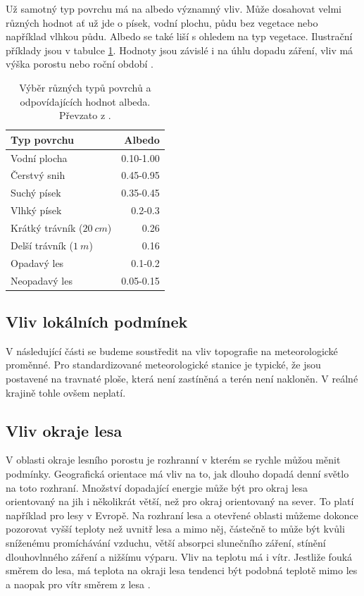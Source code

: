 Už samotný typ povrchu má na albedo významný vliv. Může dosahovat velmi různých hodnot ať už jde o písek, vodní plochu, půdu bez vegetace nebo například vlhkou půdu. Albedo se také liší s ohledem na typ vegetace. Ilustrační příklady jsou v tabulce \ref{tab:albedo}. Hodnoty jsou závislé i na úhlu dopadu záření, vliv má výška porostu nebo roční období \parencite{arya2001,alma}.

\begin{table}
\centering\footnotesize\sf
\begin{tabular}{lr}
\toprule
Typ povrchu & Albedo \\
\midrule
Vodní plocha & 0.10-1.00 \\
Čerstvý snih & 0.45-0.95 \\
Suchý písek & 0.35-0.45\\
Vlhký písek & 0.2-0.3\\
Krátký trávník ($\SI{20}{cm}$) & 0.26\\
Delší trávník ($\SI{1}{m}$) & 0.16\\
Opadavý les & 0.1-0.2\\
Neopadavý les & 0.05-0.15\\
\bottomrule
\end{tabular}
	\caption{Výběr různých typů povrchů a odpovídajících hodnot albeda. Převzato z \parencite{arya2001}.}
\label{tab:albedo}
\end{table}

\subsection{Vliv lokálních podmínek} \label{chap:topo}
V následující části se budeme soustředit na vliv topografie na meteorologické proměnné. Pro standardizované meteorologické stanice je typické, že jsou postavené na travnaté ploše, která není zastíněná a terén není nakloněn. V reálné krajině tohle ovšem neplatí.

\subsection{Vliv okraje lesa}
V oblasti okraje lesního porostu je rozhranní v kterém se rychle můžou měnit podmínky. Geografická orientace má vliv na to, jak dlouho dopadá denní světlo na toto rozhraní. Množství dopadající energie může být pro okraj lesa orientovaný na jih i několikrát větší, než pro okraj orientovaný na sever. To platí například pro lesy v Evropě. Na rozhraní lesa a otevřené oblasti můžeme dokonce pozorovat vyšší teploty než uvnitř lesa a mimo něj, částečně to může být kvůli sníženému promíchávání vzduchu, větší absorpci slunečního záření, stínění dlouhovlnného záření a nižšímu výparu. Vliv na teplotu má i vítr. Jestliže fouká směrem do lesa, má teplota na okraji lesa tendenci být podobná teplotě mimo les a naopak pro vítr směrem z lesa \parencite{alma}.

